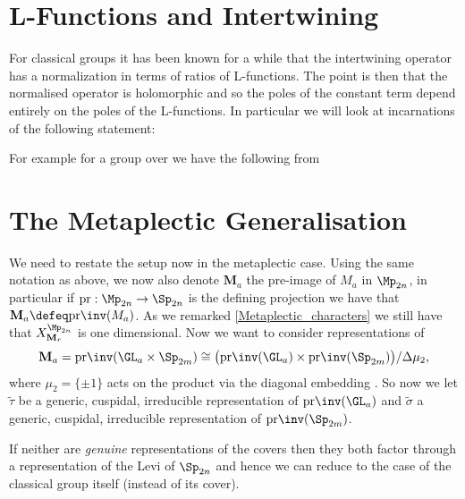 \section{L-Functions and Intertwining}\label{L_inter}
For classical groups it has been known for a while that the intertwining operator has a normalization in terms of ratios of L-functions. The point is then that the normalised operator is holomorphic and so the poles of the constant term depend entirely on the poles of the L-functions. In particular we will look at incarnations of the following statement: 


   

    For example for a group over \Q we have the following from 
    
    
    
     







     

    \section{The Metaplectic Generalisation}
    We need to restate the setup now in the metaplectic case. Using the same notation as above, we now also denote \(\mathbf{M}_a\) the pre-image of \(M_a\) in \(\Mp_{2n}\), in particular if \(\mathrm{pr}: \Mp_{2n} \to \Sp_{2n}\) is the defining projection we have that \(\mathbf{M}_a \defeq \mathrm{pr}\inv(M_a)\). As we remarked \ref{Metaplectic_characters} we still have that \(X_{\mathbf{M}_r}^{\Mp_{2n}}\) is one dimensional. Now we want to consider representations of 
    \[\mathbf{M}_a = \mathrm{pr}\inv(\GL_a \times \Sp_{2m}) \cong \big(\mathrm{pr}\inv(\GL_a)\times \mathrm{pr}\inv(\Sp_{2m})\big)/\Delta \mu_2,\]
    where \(\mu_2 = \{\pm 1\}\) acts on the product via the diagonal embedding .
    So now we let \(\tilde{\tau}\) be a generic, cuspidal, irreducible representation of \(\mathrm{pr}\inv(\GL_a)\) and \(\tilde{\sigma}\) a generic, cuspidal, irreducible representation of \(\mathrm{pr}\inv(\Sp_{2m})\). 

    \begin{remark}
        If neither are \textit{genuine} representations of the covers then they both factor through a representation of the Levi of \(\Sp_{2n}\) and hence we can reduce to the case of the classical group itself (instead of its cover).
    \end{remark}

